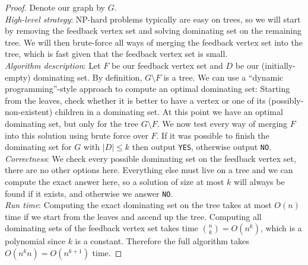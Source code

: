 \documentclass{article}
\begin{document}
\begin{proof} Denote our graph by $G$.\\

\noindent \emph{High-level strategy}: NP-hard problems typically are easy on trees, so we will start by removing the feedback vertex set and solving dominating set on the remaining tree. We will then brute-force all ways of merging the feedback vertex set into the tree, which is fast given that the feedback vertex set is small.\\

\noindent \emph{Algorithm description}: Let $F$ be our feedback vertex set and $D$ be our (initially-empty) dominating set. By definition, $G \setminus F$ is a tree. We can use a ``dynamic programming''-style approach to compute an optimal dominating set: Starting from the leaves, check whether it is better to have a vertex or one of its (possibly-non-existent) children in a dominating set. At this point we have an optimal dominating set, but only for the tree $G \setminus F$. We now test every way of merging $F$ into this solution using brute force over $F$. If it was possible to finish the dominating set for $G$ with $|D| \leq k$ then output \texttt{YES}, otherwise output \texttt{NO}.\\

\noindent \emph{Correctness}: We check every possible dominating set on the feedback vertex set, there are no other options here. Everything else must live on a tree and we can compute the exact answer here, so a solution of size at most $k$ will always be found if it exists, and otherwise we answer \texttt{NO}.\\

\noindent \emph{Run time}: Computing the exact dominating set on the tree takes at most $O(n)$ time if we start from the leaves and ascend up the tree. Computing all dominating sets of the feedback vertex set takes time $\binom{n}{k} = O(n^k)$, which is a polynomial since $k$ is a constant. Therefore the full algorithm takes $O(n^k n) = O(n^{k+1})$ time.
\end{proof}
\end{document}
